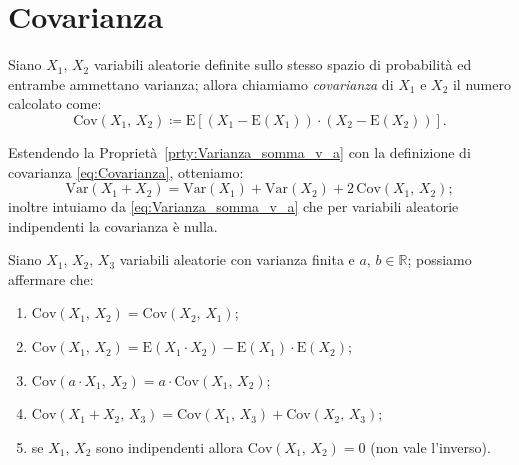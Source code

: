     \section{Covarianza}
        \begin{defn}
            Siano $X_1,\,X_2$ variabili aleatorie definite sullo stesso spazio di probabilità ed entrambe ammettano varianza; allora chiamiamo \textit{covarianza} di $X_1$ e $X_2$ il numero calcolato come:
            \begin{equation}\label{eq:Covarianza}
                \text{Cov}(X_1,\,X_2) \coloneqq \text{E}\left[(X_1-\text{E}(X_1))\cdot(X_2-\text{E}(X_2))\right]
            .\end{equation}
        \end{defn}
        \begin{obsv}
            Estendendo la Proprietà~\ref{prty:Varianza_somma_v_a} con la definizione di covarianza \eqref{eq:Covarianza}, otteniamo: \[
            \text{Var}(X_1+X_2) = \text{Var}(X_1) + \text{Var}(X_2) + 2\,\text{Cov}(X_1,\,X_2)
        ;\] inoltre intuiamo da \eqref{eq:Varianza_somma_v_a} che per variabili aleatorie indipendenti la covarianza è nulla.
        \end{obsv}
        \begin{prty}
            Siano $X_1,\,X_2,\,X_3$ variabili aleatorie con varianza finita e $a,\,b \in \mathbb{R}$; possiamo affermare che:
            \begin{enumerate}
                \item $\text{Cov}(X_1,\,X_2) = \text{Cov}(X_2,\,X_1)$;
                \item $\text{Cov}(X_1,\,X_2) = \text{E}(X_1\cdot X_2) - \text{E}(X_1)\cdot \text{E}(X_2)$;
                \item $\text{Cov}(a\cdot X_1,\,X_2) = a\cdot \text{Cov}(X_1,\,X_2)$;
                \item $\text{Cov}(X_1+X_2,\,X_3) = \text{Cov}(X_1,\,X_3)+\text{Cov}(X_2,\,X_3)$;
                \item se $X_1,\,X_2$ sono indipendenti allora $\text{Cov}(X_1,\,X_2)=0$ (non vale l'inverso).
            \end{enumerate}
        \end{prty}
